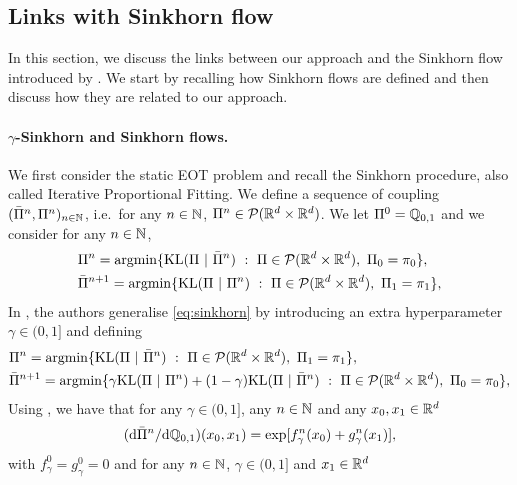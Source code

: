 \documentclass{article}
\begin{document}
\subsection{Links with Sinkhorn flow}
\label{sec:connection_sinkhorn_flows}

In this section, we discuss the links between our approach and the Sinkhorn flow introduced by \cite{karimi2024sinkhorn}. We start by recalling how Sinkhorn flows are defined and then discuss how they are related to our approach.

\paragraph{$\gamma$-Sinkhorn and Sinkhorn flows.} We first consider the static EOT problem and recall the Sinkhorn procedure, also called Iterative Proportional Fitting. We define a sequence of coupling $(\bar{\Pi}^n, \Pi^n)_{n \in \mathbb{N}}$, i.e.~for any $n \in \mathbb{N}$, $\Pi^n \in \mathcal{P}(\mathbb{R}^d \times \mathbb{R}^d)$. We let $\Pi^0 = \mathbb{Q}_{0,1}$ and we consider for any $n \in \mathbb{N}$, \begin{align}
\label{eq:sinkhorn}
    &\Pi^n = \argmin \ensembleLigne{ \KL(\Pi \ | \ \bar{\Pi}^n) }{\Pi \in \mathcal{P}(\rset^d \times \rset^d), \ \Pi_0 = \pi_0}, \\
     &\bar{\Pi}^{n+1} = \argmin \ensembleLigne{ \KL(\Pi \ | \ \Pi^n) }{\Pi \in \mathcal{P}(\rset^d \times \rset^d), \ \Pi_1 = \pi_1},
\end{align}
In \cite{karimi2024sinkhorn}, the authors generalise \eqref{eq:sinkhorn} by introducing an extra hyperparameter $\gamma \in (0,1]$ and defining 
\begin{align}
\label{eq:gamma_sinkhorn}
    &\Pi^n = \argmin \ensembleLigne{ \KL(\Pi \ | \ \bar{\Pi}^n) }{\Pi \in \mathcal{P}(\rset^d \times \rset^d), \ \Pi_1 = \pi_1}, \\
     &\bar{\Pi}^{n+1} = \argmin \ensembleLigne{ \gamma \KL(\Pi \ | \ \Pi^n) + (1-\gamma) \KL(\Pi \ | \ \bar{\Pi}^{n}) }{\Pi \in \mathcal{P}(\rset^d \times \rset^d), \ \Pi_0 = \pi_0},
\end{align}
Using \cite[Lemma 2]{karimi2024sinkhorn}, we have that for any $\gamma \in (0,1]$, any $n \in \mathbb{N}$ and any $x_0, x_1 \in \mathbb{R}^d$
\begin{equation}
\label{eq:pi_n_sinkhorn}
    (\rmd \bar{\Pi}^n / \rmd \Qbb_{0,1})(x_0, x_1) = \exp[f_\gamma^n(x_0) + g_\gamma^n(x_1)] ,
\end{equation}
with $f_\gamma^0 = g_\gamma^0 = 0$ and for any $n \in \mathbb{N}$, $\gamma \in (0,1]$ and $x_1 \in \mathbb{R}^d$
\end{document}
